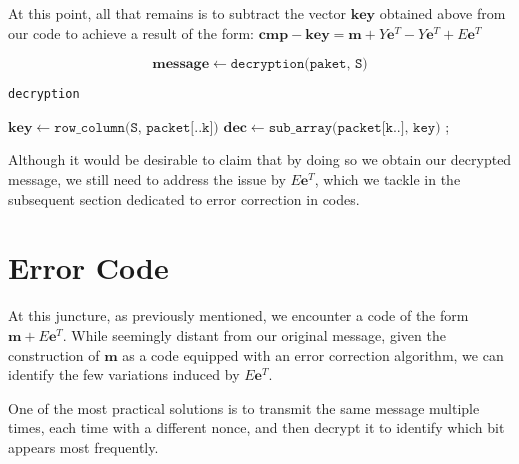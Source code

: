 At this point, all that remains is to subtract the vector $\mathbf{key}$ obtained above from our code to achieve a result of the form:
$
\mathbf{cmp} - \mathbf{key} = \mathbf{m} + Y\mathbf{e}^T - Y\mathbf{e}^T +  E\mathbf{e}^T
$

$$
\mathbf{message}\leftarrow\texttt{decryption(paket, S)}
$$

\begin{algorithm}[H]
\caption{\texttt{decryption}}
\label{dec}

\DontPrintSemicolon
\SetStartEndCondition{ }{}{}
\AlgoDontDisplayBlockMarkers\SetAlgoNoEnd\SetAlgoNoLine

$\mathbf{key} \leftarrow \texttt{row\_column(S, packet[..k])}$ 
$\mathbf{dec} \leftarrow \texttt{sub\_array(packet[k..], key)}$ 
;
\end{algorithm}

Although it would be desirable to claim that by doing so we obtain our decrypted message, we still need to address the issue by $E\mathbf{e}^T$, which we tackle in the subsequent section dedicated to error correction in codes.



\section{Error Code}
At this juncture, as previously mentioned, we encounter a code of the form $\mathbf{m}+E\mathbf{e}^T$. While seemingly distant from our original message, given the construction of $\mathbf{m}$ as a code equipped with an error correction algorithm, we can identify the few variations induced by $E\mathbf{e}^T$.

One of the most practical solutions is to transmit the same message multiple times, each time with a different nonce, and then decrypt it to identify which bit appears most frequently.
